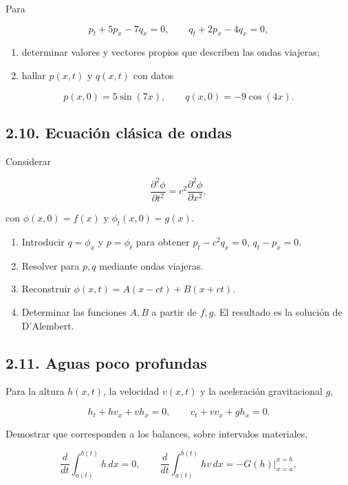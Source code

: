 \documentclass[11pt,a4paper]{article}
\begin{document}
Para

\[p_t+5p_x-7q_x=0,\qquad q_t+2p_x-4q_x=0,\]

\begin{enumerate}
\def\labelenumi{(\alph{enumi})}
\item
  determinar valores y vectores propios que describen las ondas
  viajeras;
\item
  hallar \(p(x,t)\) y \(q(x,t)\) con datos
\end{enumerate}

\[p(x,0)=5\sin(7x),\qquad q(x,0)=-9\cos(4x).\]

\hypertarget{ecuaciuxf3n-cluxe1sica-de-ondas}{%
\subsection{2.10. Ecuación clásica de
ondas}\label{ecuaciuxf3n-cluxe1sica-de-ondas}}

Considerar

\[\frac{\partial^2\phi}{\partial t^2}=c^2\frac{\partial^2\phi}{\partial x^2},\tag{2.52}\]

con \(\phi(x,0)=f(x)\) y \(\phi_t(x,0)=g(x)\).

\begin{enumerate}
\def\labelenumi{(\alph{enumi})}
\item
  Introducir \(q=\phi_x\) y \(p=\phi_t\) para obtener \(p_t-c^2q_x=0\),
  \(q_t-p_x=0\).
\item
  Resolver para \(p,q\) mediante ondas viajeras.
\item
  Reconstruir \(\phi(x,t)=A(x-ct)+B(x+ct)\).
\item
  Determinar las funciones \(A,B\) a partir de \(f,g\). El resultado es
  la solución de D'Alembert.
\end{enumerate}

\hypertarget{aguas-poco-profundas}{%
\subsection{2.11. Aguas poco profundas}\label{aguas-poco-profundas}}

Para la altura \(h(x,t)\), la velocidad \(v(x,t)\) y la aceleración
gravitacional \(g\),

\[h_t+hv_x+vh_x=0,\qquad v_t+vv_x+gh_x=0.\]

Demostrar que corresponden a los balances, sobre intervalos materiales,

\[\frac{d}{dt}\int_{a(t)}^{b(t)}h\,dx=0,\qquad \frac{d}{dt}\int_{a(t)}^{b(t)}hv\,dx=-G(h)\Big|_{x=a}^{x=b},\]
\end{document}
